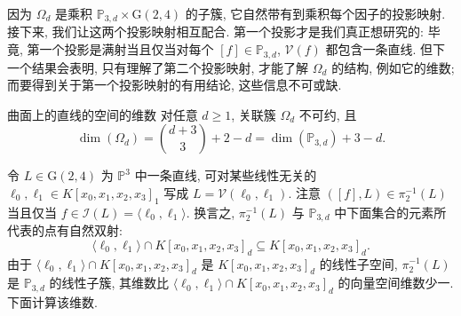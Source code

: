因为 $\Omega_{d}$ 是乘积 $\mathbb{P}_{3,d}\times\mathrm{G}(2,4)$ 的子簇, 它自然带有到乘积每个因子的投影映射. 接下来, 我们让这两个投影映射相互配合. 第一个投影才是我们真正想研究的: 毕竟, 第一个投影是满射当且仅当对每个 $[f]\in\mathbb{P}_{3,d}$, $\mathcal{V}(f)$ 都包含一条直线. 但下一个结果会表明, 只有理解了第二个投影映射, 才能了解 $\Omega_{d}$ 的结构, 例如它的维数; 而要得到关于第一个投影映射的有用结论, 这些信息不可或缺.

\begin{Proposition}{曲面上的直线的空间的维数}\leavevmode\label{prop:dimension-of-incidence-variety-of-lines-on-surfaces}
对任意 $d\ge1$, 关联簇 $\Omega_{d}$ 不可约, 且
\[
  \dim(\Omega_{d})=\binom{d+3}{3}+2-d=\dim(\mathbb{P}_{3,d})+3-d.
\]
\end{Proposition}
\begin{Proof}
令 $L\in\mathrm{G}(2,4)$ 为 $\mathbb{P}^{3}$ 中一条直线, 可对某些线性无关的 $\ell_{0},\ell_{1}\in K[x_{0},x_{1},x_{2},x_{3}]_{1}$ 写成 $L=\mathcal{V}(\ell_{0},\ell_{1})$. 注意 $([f],L)\in\pi_{2}^{-1}(L)$ 当且仅当 $f\in\mathcal{I}(L)=\langle\ell_{0},\ell_{1}\rangle$. 换言之, $\pi_{2}^{-1}(L)$ 与 $\mathbb{P}_{3,d}$ 中下面集合的元素所代表的点有自然双射:
\[
  \langle\ell_{0},\ell_{1}\rangle\cap K[x_{0},x_{1},x_{2},x_{3}]_{d}
  \subseteq K[x_{0},x_{1},x_{2},x_{3}]_{d}.
\]
由于 $\langle\ell_{0},\ell_{1}\rangle\cap K[x_{0},x_{1},x_{2},x_{3}]_{d}$ 是 $K[x_{0},x_{1},x_{2},x_{3}]_{d}$ 的线性子空间, $\pi_{2}^{-1}(L)$ 是 $\mathbb{P}_{3,d}$ 的线性子簇, 其维数比 $\langle\ell_{0},\ell_{1}\rangle\cap K[x_{0},x_{1},x_{2},x_{3}]_{d}$ 的向量空间维数少一. 下面计算该维数.


\end{Proof}
